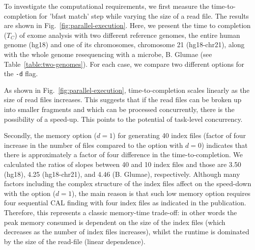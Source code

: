 \documentclass{sig-alternate}
\begin{document}

To investigate the computational requirements, we first measure the
time-to-completion for 'bfast match' step while varying the size of a
read file.  The results are shown in
Fig.~\ref{fig:parallel-execution}. %
Here, we present the time to completion ($T_C$) of exome analysis with
two different reference genomes, the entire human genome (hg18) and
one of its chromosomes, chromosome 21 (hg18-chr21), along with the whole genome
resequencing with a microbe, B. Glumae\cite{kim2011} (see Table~\ref{table:two-genomes}).  For
each case, we compare two different options for the \texttt{-d} flag.

As shown in Fig.~\ref{fig:parallel-execution}, time-to-completion 
scales linearly as the size of read files increases.
This suggests that if the read files can be broken up into smaller
fragments and which can be processed concurrently, there is the
possibility of a speed-up. This points to the potential of task-level
concurrency.


Secondly, the memory option ($d=1$) for generating 40 index files
(factor of four increase in the number of files compared to the option with $d=0$) indicates that there is
approximately a factor of four difference in the time-to-completion.
We calculated the ratios of slopes between 40 and 10 index files and
those are 3.50 (hg18), 4.25 (hg18-chr21), and 4.46 (B. Glumae),
respectively.  
Although many factors including the complex structure of the index
files affect on the speed-down with the option ($d=1$), the main
reason is that such low memory option requires four sequential CAL
finding with four index files as indicated in the
publication\cite{bfast2009}.  Therefore, this represents a classic
memory-time trade-off: in other words the peak memory consumed is
dependent on the size of the index files (which decreases as the
number of index files increases), whilst the runtime is dominated by
the size of the read-file (linear dependence).
\end{document}
